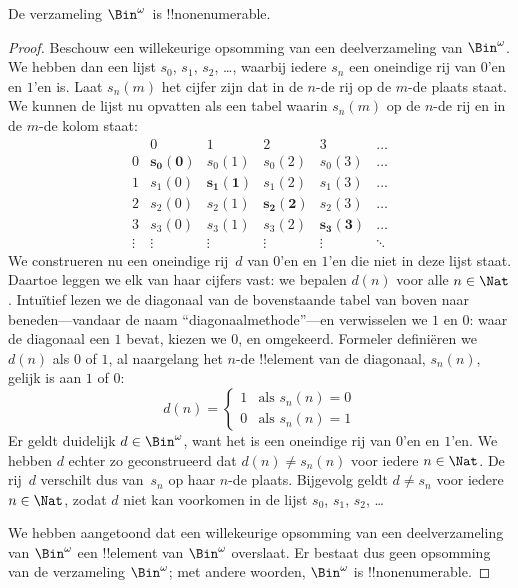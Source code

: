 \documentclass[../../../include/open-logic-section]{subfiles}
\begin{document}
\begin{thm}
De verzameling $\Bin^\omega$~is !!{nonenumerable}.
\end{thm}

\begin{proof}
Beschouw een willekeurige opsomming van een deelverzameling van
$\Bin^\omega$. We hebben dan een lijst $s_{0}$, $s_{1}$, $s_{2}$,
\dots{}, waarbij iedere $s_n$ een oneindige rij van $0$'en en $1$'en is.
Laat $s_n(m)$ het cijfer zijn dat in de $n$-de rij op de $m$-de plaats
staat.
We kunnen de lijst nu opvatten als een tabel waarin $s_n(m)$ op de
$n$-de rij en in de $m$-de kolom staat:
\[
\begin{array}{c|c|c|c|c|c}
& 0 & 1 & 2 & 3 & \dots \\\hline
0 & \mathbf{s_{0}(0)} & s_{0}(1) & s_{0}(2) & s_0(3) & \dots \\\hline
1 & s_{1}(0)& \mathbf{s_{1}(1)} & s_1(2) & s_1(3) & \dots \\\hline
2 & s_{2}(0)& s_{2}(1) & \mathbf{s_2(2)} & s_2(3) & \dots \\\hline
3 & s_{3}(0)& s_{3}(1) & s_3(2) & \mathbf{s_3(3)} & \dots \\\hline
\vdots & \vdots & \vdots & \vdots & \vdots & \mathbf{\ddots}
\end{array}
\]
We construeren nu een oneindige rij~$d$ van $0$'en en $1$'en die niet
in deze lijst staat. Daartoe leggen we elk van haar cijfers vast: we
bepalen $d(n)$ voor alle $n \in \Nat$. Intuïtief lezen we de diagonaal
van de bovenstaande tabel van boven naar beneden---vandaar de naam
``diagonaalmethode''---en verwisselen we $1$ en $0$: waar de diagonaal
een $1$ bevat, kiezen we $0$, en omgekeerd. Formeler definiëren we
$d(n)$ als $0$ of $1$,
al naargelang het $n$-de !!{element} van de diagonaal, $s_n(n)$, gelijk
is aan $1$ of $0$:
\[
d(n) =
\begin{cases}
1 & \text{als $s_{n}(n) = 0$}\\
0 & \text{als $s_{n}(n) = 1$}
\end{cases}
\]
Er geldt duidelijk $d \in \Bin^\omega$, want het is een oneindige rij
van $0$'en en $1$'en. We hebben $d$ echter zo geconstrueerd dat
$d(n) \neq s_n(n)$ voor iedere $n \in \Nat$. De rij~$d$ verschilt dus
van~$s_n$ op haar $n$-de plaats. Bijgevolg geldt $d \neq s_n$ voor
iedere $n\in \Nat$, zodat $d$ niet kan voorkomen in de lijst $s_0$,
$s_1$, $s_2$, \dots

We hebben aangetoond dat een willekeurige opsomming van een
deelverzameling van $\Bin^\omega$ een !!{element} van $\Bin^\omega$
overslaat. Er bestaat dus geen opsomming van de verzameling
$\Bin^\omega$; met andere woorden, $\Bin^\omega$ is
!!{nonenumerable}.
\end{proof}
\end{document}
